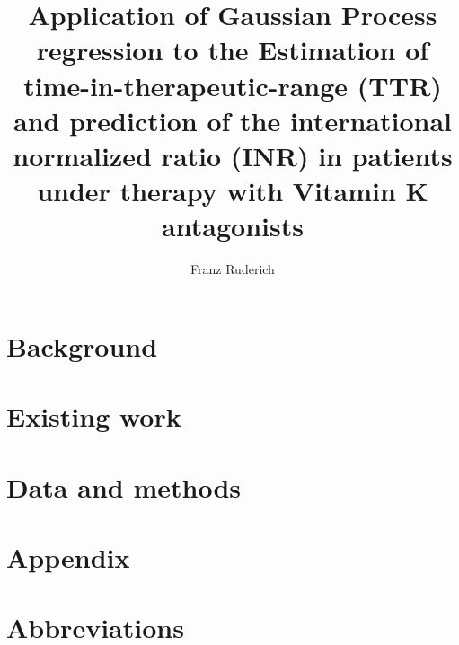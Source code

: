 \documentclass[12pt]{article}
\title{Application of Gaussian Process regression to the Estimation of time-in-therapeutic-range (TTR) and prediction of the international normalized ratio (INR) in patients under therapy with Vitamin K antagonists}
\author{Franz Ruderich}
\begin{document}
	\maketitle
	
	\clearpage
	
	
	
	\tableofcontents
	
	\clearpage
		
	\section{Background}
	\graphicspath{{background/}}
	
	
	\clearpage
	\graphicspath{{existing_work/}}
	\section{Existing work}
	
	
	\graphicspath{{data_and_methods/}}
	\section{Data and methods}
	
	
	\clearpage
	
	\section{Appendix}
	
	
	\section*{Abbreviations}
	
	
\end{document}
